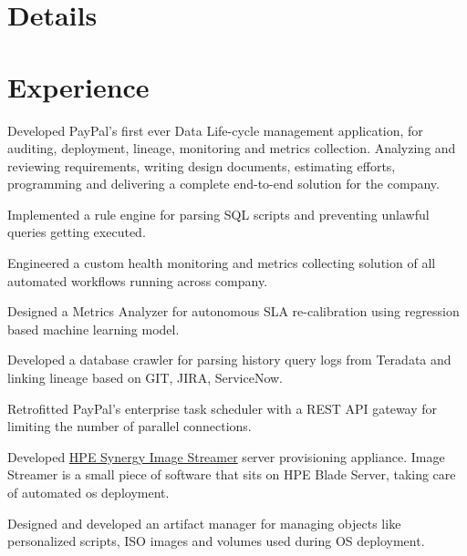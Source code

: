 \documentclass[]{kushal-resume}
\begin{document}
\begin{minipage}[t]{0.66\textwidth}
	

\section{Details}
\sectionsep

\section{Experience}

\vspace{\topsep}
\begin{tightemize}\item Developed PayPal's first ever Data Life-cycle management application, for auditing, deployment, lineage, monitoring and metrics collection.
Analyzing and reviewing requirements, writing design documents, estimating efforts, programming and delivering a complete end-to-end solution for the company.
\item Implemented a rule engine for parsing SQL scripts and preventing unlawful queries getting executed.
\item Engineered a custom health monitoring and metrics collecting  solution of all automated workflows running across company.
\item Designed a Metrics Analyzer for autonomous SLA re-calibration using regression based machine learning model.
\item Developed a database crawler for parsing history query logs from Teradata and linking lineage based on GIT, JIRA, ServiceNow.
\item Retrofitted PayPal's enterprise task scheduler with a REST API gateway for limiting the number of parallel connections.
\end{tightemize}
\sectionsep

\begin{tightemize}
\item Developed \href{https://buy.hpe.com/us/en/synergy/synergy-management/synergy-image-streamer/synergy-image-streamer/hpe-synergy-image-streamer/p/1008615214}{HPE Synergy Image Streamer} server provisioning appliance.
Image Streamer is a small piece of software that sits on HPE Blade Server, taking care of automated os deployment.
\item Designed and developed an artifact manager for managing objects like personalized scripts, ISO images and volumes used during OS deployment. 
\end{tightemize}
\sectionsep


\end{minipage}
\end{document}
